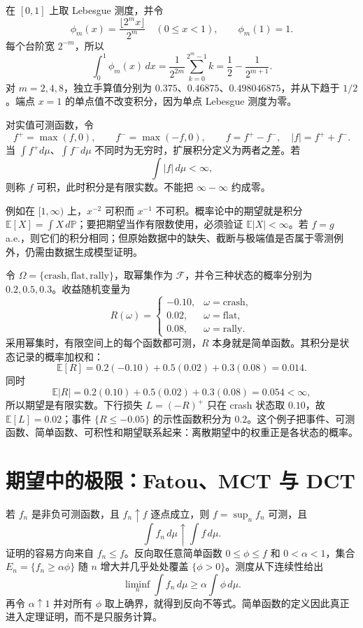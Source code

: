 在 $[0,1]$ 上取 Lebesgue 测度，并令
\[
 \phi_m(x)=\frac{\lfloor2^m x\rfloor}{2^m}\quad(0\leq x<1),
 \qquad \phi_m(1)=1.
\]
每个台阶宽 $2^{-m}$，所以
\[
 \int_0^1\phi_m(x)\,dx
 =\frac1{2^{2m}}\sum_{k=0}^{2^m-1}k
 =\frac12-\frac1{2^{m+1}}.
\]
对 $m=2,4,8$，独立手算值分别为 $0.375$、$0.46875$、$0.498046875$，并从下趋于 $1/2$。端点 $x=1$ 的单点值不改变积分，因为单点 Lebesgue 测度为零。


对实值可测函数，令
\[
 f^+=\max(f,0),\qquad f^-=\max(-f,0),\qquad
 f=f^+-f^-,\quad |f|=f^++f^-.
\]
当 $\int f^+d\mu$、$\int f^-d\mu$ 不同时为无穷时，扩展积分定义为两者之差。若
\[
 \int|f|\,d\mu<\infty,
\]
则称 $f$ 可积，此时积分是有限实数。不能把 $\infty-\infty$ 约成零。

例如在 $[1,\infty)$ 上，$x^{-2}$ 可积而 $x^{-1}$ 不可积。概率论中的期望就是积分 $\mathbb E[X]=\int X\,d\mathbb P$；要把期望当作有限数使用，必须验证 $\mathbb E|X|<\infty$。若 $f=g$ a.e.，则它们的积分相同；但原始数据中的缺失、截断与极端值是否属于零测例外，仍需由数据生成模型证明。


令 $\Omega=\{\text{crash},\text{flat},\text{rally}\}$，取幂集作为 $\mathcal F$，并令三种状态的概率分别为 $0.2,0.5,0.3$。收益随机变量为
\[
 R(\omega)=
 \begin{cases}
  -0.10,&\omega=\text{crash},\\
   0.02,&\omega=\text{flat},\\
   0.08,&\omega=\text{rally}.
 \end{cases}
\]
采用幂集时，有限空间上的每个函数都可测，$R$ 本身就是简单函数。其积分是状态记录的概率加权和：
\[
 \mathbb E[R]=0.2(-0.10)+0.5(0.02)+0.3(0.08)=0.014.
\]
同时
\[
 \mathbb E|R|=0.2(0.10)+0.5(0.02)+0.3(0.08)=0.054<\infty,
\]
所以期望是有限实数。下行损失 $L=(-R)^+$ 只在 crash 状态取 $0.10$，故 $\mathbb E[L]=0.02$；事件 $\{R\leq-0.05\}$ 的示性函数积分为 $0.2$。这个例子把事件、可测函数、简单函数、可积性和期望联系起来：离散期望中的权重正是各状态的概率。

\section{期望中的极限：Fatou、MCT 与 DCT}


若 $f_n$ 是非负可测函数，且 $f_n\uparrow f$ 逐点成立，则 $f=\sup_nf_n$ 可测，且
\[
 \int f_n\,d\mu\uparrow\int f\,d\mu.
\]
证明的容易方向来自 $f_n\leq f$。反向取任意简单函数 $0\leq\phi\leq f$ 和 $0<\alpha<1$，集合 $E_n=\{f_n\geq\alpha\phi\}$ 随 $n$ 增大并几乎处处覆盖 $\{\phi>0\}$。测度从下连续性给出
\[
 \liminf_n\int f_n\,d\mu
 \geq\alpha\int\phi\,d\mu.
\]
再令 $\alpha\uparrow1$ 并对所有 $\phi$ 取上确界，就得到反向不等式。简单函数的定义因此真正进入定理证明，而不是只服务计算。

